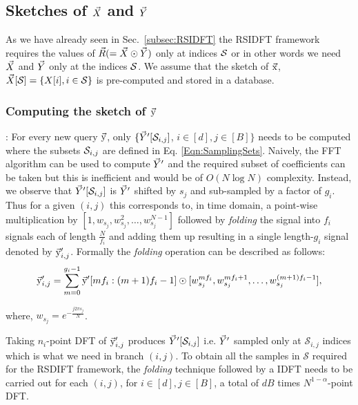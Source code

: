 \subsection{Sketches of $\vec{X}$ and $\vec{Y}$}
\label{subsec:skteches}		
 As we have already seen in Sec.~\ref{subsec:RSIDFT} the RSIDFT framework requires the values of $\vec{R}(=\vec{X}\odot \vec{Y})$ only at indices $\mathcal{S}$ or in other words we need $\vec{X}$ and $\vec{Y}$ only at the indices $\mathcal{S}$. We assume that the sketch of $\vec{\mathrm{x}}$, $ \vec{X}[\mathcal{S}]= \{X[i],i\in \mathcal{S}\}$ is pre-computed and stored in a database.

\subsubsection*{Computing the sketch of $\vec{\mathrm{y}}$}: For every new query $\vec{\mathrm{y}}$, only $\{\vec{Y}'[\mathcal{S}_{i,j}]$,  $i\in[d],j\in[B]\}$ needs to be computed where the subsets $\mathcal{S}_{i,j}$ are defined in Eq. \eqref{Eqn:SamplingSets}. Naively, the FFT algorithm can be used to compute $\vec{Y}'$ and the required subset of coefficients can be taken but this is inefficient and would be of $O(N \log N)$ complexity. Instead, we observe that $\vec{Y}'[\mathcal{S}_{i,j}]$ is $\vec{Y}'$ shifted by $s_j$ and sub-sampled by a factor of $g_i$. Thus for a given $(i,j)$ this corresponds to, in time domain, a point-wise multiplication by $[1,w_{s_j},w_{s_j}^2,\ldots,w_{s_j}^{N-1}]$ followed by \textit{folding} the signal into $f_i$ signals each of length $\frac{N}{f_i}$ and adding them up resulting in a single length-$g_i$ signal denoted by $\vec{\mathrm{y}}'_{i,j}$. Formally the \textit{folding} operation can be described as follows:
	  \begin{equation}
	  	\vec{\mathrm{y}}'_{i,j} = \sum \limits_{m = 0}^{g_i-1} \vec{\mathrm{y}}'[mf_i:(m+1)f_i-1] \odot [w_{s_j}^{mf_i},w_{s_j}^{mf_i+1},\ldots, w_{s_j}^{(m+1)f_i-1}],
	  \end{equation}
	
	  where, $w_{s_j}=e^{-\frac{j2\pi s_j}{N}}$.
	
 Taking $n_i$-point DFT of $\vec{\mathrm{y}}'_{i,j}$ produces $\vec{Y}'[\mathcal{S}_{i,j}]$ i.e. $\vec{Y}'$ sampled only at $\mathcal{S}_{i,j}$ indices which is what we need in branch $(i,j)$. To obtain all the samples in $\mathcal{S}$ required for the RSDIFT framework, the \textit{folding} technique followed by a IDFT needs to be carried out for each $(i,j)$, for $i\in[d],j\in[B]$, a total of $dB$ times $N^{1-\alpha}$-point DFT.

